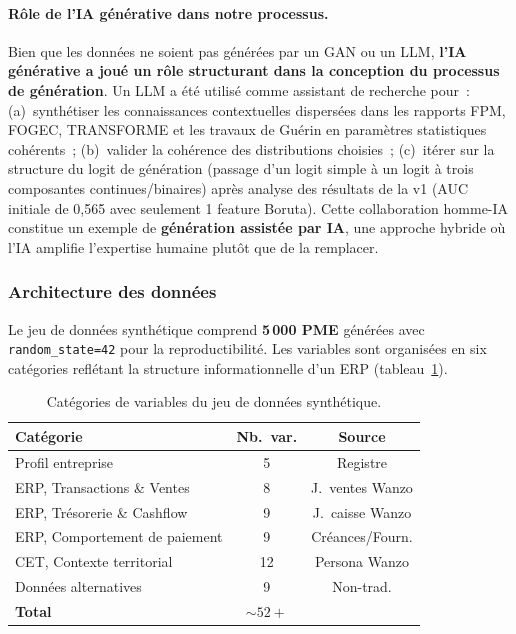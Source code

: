 \documentclass[12pt, a4paper, twocolumn]{article}
\begin{document}
\paragraph{Rôle de l'IA générative dans notre processus.}
Bien que les données ne soient pas générées par un GAN ou un LLM, \textbf{l'IA générative a joué un rôle structurant dans la conception du processus de génération}. Un LLM a été utilisé comme assistant de recherche pour~: (a)~synthétiser les connaissances contextuelles dispersées dans les rapports FPM, FOGEC, TRANSFORME et les travaux de Guérin en paramètres statistiques cohérents~; (b)~valider la cohérence des distributions choisies~; (c)~itérer sur la structure du logit de génération (passage d'un logit simple à un logit à trois composantes continues/binaires) après analyse des résultats de la v1 (AUC initiale de 0,565 avec seulement 1 feature Boruta). Cette collaboration homme-IA constitue un exemple de \textbf{génération assistée par IA}, une approche hybride où l'IA amplifie l'expertise humaine plutôt que de la remplacer.

\subsubsection{Architecture des données}
\label{subsubsec:architecture}

Le jeu de données synthétique comprend \textbf{5\,000 PME} générées avec \texttt{random\_state=42} pour la reproductibilité. Les variables sont organisées en six catégories reflétant la structure informationnelle d'un ERP (tableau~\ref{tab:categories}).

\begin{table}[htbp]
\centering
\caption{Catégories de variables du jeu de données synthétique.}
\label{tab:categories}
\small
\begin{tabularx}{\columnwidth}{@{}Xcc@{}}
\toprule
\textbf{Catégorie} & \textbf{Nb.\ var.} & \textbf{Source} \\
\midrule
Profil entreprise & 5 & Registre \\
ERP, Transactions \& Ventes & 8 & J.\ ventes Wanzo \\
ERP, Trésorerie \& Cashflow & 9 & J.\ caisse Wanzo \\
ERP, Comportement de paiement & 9 & Créances/Fourn. \\
CET, Contexte territorial & 12 & Persona Wanzo \\
Données alternatives & 9 & Non-trad. \\
\midrule
\textbf{Total} & \textbf{${\sim}52+$} & \\
\bottomrule
\end{tabularx}
\end{table}
\end{document}
